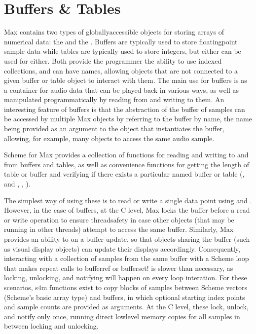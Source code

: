 \documentclass[letterpaper,10pt,english]{sphinxmanual}
\begin{document}
\section{Buffers \& Tables}
\label{\detokenize{features_usage:buffers-tables}}
\sphinxAtStartPar
Max contains two types of globally\sphinxhyphen{}accessible objects for storing arrays of numerical data: the 
and the . Buffers are typically used to store floating\sphinxhyphen{}point sample
data while tables are typically used to store integers, but either can be used for either.
Both provide the programmer the ability to use indexed collections, and can have names,
allowing objects that are not connected to a given buffer or table object
to interact with them. The main use for buffers is as a container
for audio data that can be played back in various ways, as well as
manipulated programmatically by reading from and writing to them.
An interesting feature of buffers is that the abstraction of the buffer
of samples can be accessed by multiple Max objects by referring to the
buffer by name, the name being provided as an argument to the 
object that instantiates the buffer, allowing, for example, many objects to access
the same audio sample.

\sphinxAtStartPar
Scheme for Max provides a collection of functions for reading and writing
to and from buffers and tables, as well as convenience functions for
getting the length of table or buffer and verifying if there exists
a particular named buffer or table (, and ,
, ).

\sphinxAtStartPar
The simplest way of using these is to read or write a single data
point using  and .
However, in the case of buffers, at the C level, Max locks the buffer before a read
or write operation to ensure thread\sphinxhyphen{}safety in case other objects (that
may be running in other threads) attempt to access the same buffer.
Similarly, Max provides an ability to  on a buffer update,
so that objects sharing the buffer (such as visual display objects)
can update their displays accordingly.
Consequently, interacting with a collection of samples from the same
buffer with a Scheme loop that makes repeat
calls to buffer\sphinxhyphen{}ref or buffer\sphinxhyphen{}set! is slower than necessary,
as locking, unlocking, and notifying will happen on every loop interation.
For these scenarios, s4m functions exist to copy blocks of samples between
Scheme vectors (Scheme’s basic array type) and buffers, in
which optional starting index points and sample counts are provided as arguments.
At the C level, these lock, unlock, and notify only once, running
direct low\sphinxhyphen{}level memory copies for all samples in between locking and unlocking.
\end{document}
